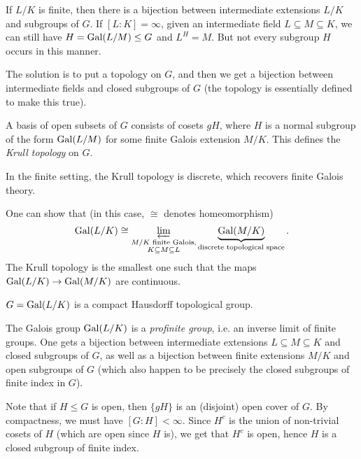 \begin{remark}
  If $L / K$ is finite, then there is a bijection
  between intermediate extensions
  $L / K$ and subgroups of $G$. If
  $[L : K] = \infty$, given
  an intermediate field $L \subseteq M \subseteq K$,
  we can still have $H = \operatorname{Gal}(L / M) \le G$
  and $L^H = M$. But not every subgroup
  $H$ occurs in this manner.

  The solution is to put a topology on $G$,
  and then we get a bijection between
  intermediate fields and closed subgroups
  of $G$ (the topology is essentially defined
  to make this true).
\end{remark}

\begin{definition}
  A basis of open subsets of $G$ consists of
  cosets $gH$, where $H$ is a normal subgroup
  of the form $\operatorname{Gal}(L / M)$ for some
  finite Galois extension $M / K$. This
  defines the \emph{Krull topology} on $G$.
\end{definition}

\begin{remark}
  In the finite setting, the Krull topology
  is discrete, which recovers
  finite Galois theory.
\end{remark}

\begin{remark}
  One can show that (in this case, $\cong$
  denotes homeomorphism)
  \[
    \operatorname{Gal}(L / K) \cong \varprojlim_{\substack{M / K \text{ finite Galois,} \\ K \subseteq M \subseteq L}}
    \underbrace{\operatorname{Gal}(M / K)}_{\text{discrete topological space}}.
  \]
  The Krull topology is the smallest one
  such that the maps
  $\operatorname{Gal}(L / K) \to \operatorname{Gal}(M / K)$ are continuous.
\end{remark}

\begin{prop}
  $G = \operatorname{Gal}(L / K)$ is a compact Hausdorff
  topological group.
\end{prop}

\begin{remark}
  The Galois group $\operatorname{Gal}(L / K)$ is a
  \emph{profinite group}, i.e. an inverse
  limit of finite groups. One gets a
  bijection between intermediate extensions
  $L \subseteq M \subseteq K$ and closed
  subgroups of $G$, as well as a bijection
  between finite extensions $M / K$ and
  open subgroups of $G$ (which also happen to
  be precisely the closed subgroups of finite
  index in $G$).

  Note that if $H \le G$ is open, then
  $\{gH\}$ is an (disjoint) open cover of $G$.
  By compactness, we must have
  $[G : H] < \infty$. Since $H^c$ is the union
  of non-trivial cosets of $H$ (which are
  open since $H$ is), we get that $H^c$ is
  open, hence $H$ is a closed subgroup of
  finite index.
\end{remark}

